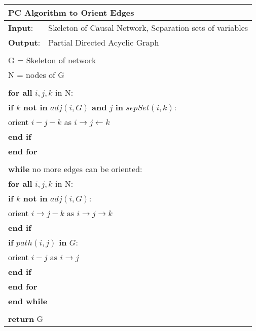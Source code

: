 \documentclass{article}
\begin{document}
\begin{table}[h!]
	\begin{tabular}{|l l|}
		\hline
		\multicolumn{2}{|l|}{PC Algorithm to Orient Edges}\\ 
		\hline
		\textbf{Input}: & Skeleton of Causal Network, Separation sets of variables\\
		\textbf{Output}: & Partial Directed Acyclic Graph\\
		&\\
		\multicolumn{2}{|l|}{G = Skeleton of network}\\
		\multicolumn{2}{|l|}{N = nodes of G}\\
		&\\
		\multicolumn{2}{|l|}{\textbf{for all} $ i,j,k $ in N:}\\
		\multicolumn{2}{|l|}{\quad\textbf{if} $ k $ \textbf{not in} $ adj(i,G) $ \textbf{and} $ j $ \textbf{in} $sepSet( i,k)$:}\\
		\multicolumn{2}{|l|}{\quad\quad orient $ i-j-k $ as $ i\rightarrow j \leftarrow k $ }\\
		\multicolumn{2}{|l|}{\quad\textbf{end if}}\\
		\multicolumn{2}{|l|}{\textbf{end for}}\\
		&\\
		\multicolumn{2}{|l|}{\textbf{while} no more edges can be oriented:}\\
		\multicolumn{2}{|l|}{\quad\textbf{for all} $ i,j,k $ in N:}\\
		\multicolumn{2}{|l|}{\quad\quad\textbf{if} $ k $ \textbf{not in} $ adj(i,G) $:}\\
		\multicolumn{2}{|l|}{\quad\quad\quad orient $ i\rightarrow j-k $ as $ i\rightarrow j \rightarrow k $ }\\
		\multicolumn{2}{|l|}{\quad\quad\textbf{end if}}\\
		\multicolumn{2}{|l|}{\quad\quad\textbf{if} $ path(i,j)$ \textbf{in} $G $:}\\
		\multicolumn{2}{|l|}{\quad\quad\quad orient $ i- j $ as $ i\rightarrow j $ }\\
		\multicolumn{2}{|l|}{\quad\quad\textbf{end if}}\\

		\multicolumn{2}{|l|}{\quad\textbf{end for}}\\
		\multicolumn{2}{|l|}{\textbf{end while}}\\
		&\\
		\multicolumn{2}{|l|}{\textbf{return} G}\\
		\hline 
	\end{tabular}
\end{table}
\end{document}
